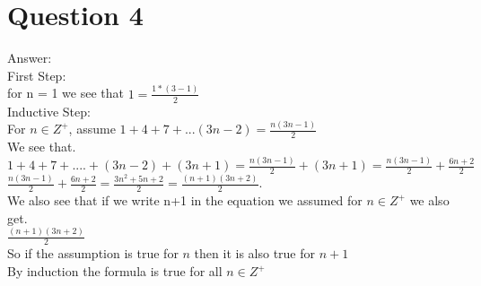 \documentclass[12pt]{article}
\begin{document}
\section*{Question 4}
    
Answer:\\
    
    First Step:\\
    
        for n = 1 we see that $1 = \frac{1*(3-1)}{2}$\\
        
    Inductive Step:\\
    
        For $n \in Z^+$, assume $1 + 4 + 7 + ... (3n-2) = \frac{n(3n-1)}{2}$\\
        
        We see that.\\
        
        $1 + 4 + 7 + .... + (3n-2) + (3n+1) = \frac{n(3n-1)}{2} + (3n + 1) = \frac{n(3n-1)}{2} + \frac{6n+2}{2}$\\
        
        $\frac{n(3n-1)}{2} + \frac{6n+2}{2} = \frac{3n^2 + 5n + 2}{2} = \frac{(n+1)(3n+2)}{2}$.\\
        
        We also see that if we write n+1 in the equation we assumed for $n \in Z^+$ we also get.\\
        
        $\frac{(n+1)(3n+2)}{2}$\\
        
        So if the assumption is true for $n$ then it is also true for $n+1$\\
    
    By induction the formula is true for all $n\in Z^+$
\end{document}
